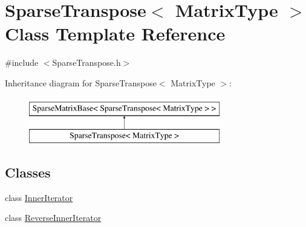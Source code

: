 \hypertarget{class_sparse_transpose}{\section{Sparse\-Transpose$<$ Matrix\-Type $>$ Class Template Reference}
\label{class_sparse_transpose}
}


{\ttfamily \#include $<$Sparse\-Transpose.\-h$>$}

Inheritance diagram for Sparse\-Transpose$<$ Matrix\-Type $>$\-:\begin{figure}[H]
\begin{center}
\leavevmode
\includegraphics[height=2.000000cm]{class_sparse_transpose}
\end{center}
\end{figure}
\subsection*{Classes}
\begin{DoxyCompactItemize}
\item 
class \hyperlink{class_sparse_transpose_1_1_inner_iterator}{Inner\-Iterator}
\item 
class \hyperlink{class_sparse_transpose_1_1_reverse_inner_iterator}{Reverse\-Inner\-Iterator}
\end{DoxyCompactItemize}
